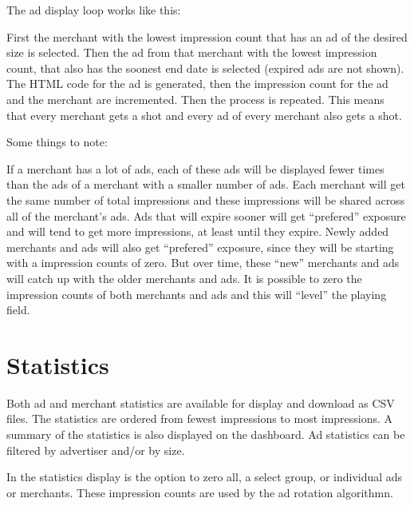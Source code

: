 \documentclass[letterpaper]{article}
\begin{document}
The ad display loop works like this:

First the merchant with the lowest impression count that has an ad of
the desired size is selected.  Then the ad from that merchant with the
lowest impression count, that also has the soonest end date is selected
(expired ads are not shown).  The HTML code for the ad is generated,
then the impression count for the ad and the merchant are incremented.
Then the process is repeated.  This means that every merchant gets a
shot and every ad of every merchant also gets a shot.

Some things to note:

If a merchant has a lot of ads, each of these ads will be displayed
fewer times than the ads of a merchant with a smaller number of ads. 
Each merchant will get the same number of total impressions and these
impressions will be shared across all of the merchant's ads.  Ads that
will expire sooner will get ``prefered'' exposure and will tend to get
more impressions, at least until they expire.  Newly added merchants and
ads will also get ``prefered'' exposure, since they will be starting
with a impression counts of zero.  But over time, these ``new''
merchants and ads will catch up with the older merchants and ads.  It is
possible to zero the impression counts of both merchants and ads and
this will ``level'' the playing field.

\section{Statistics}

Both ad and merchant statistics are available for display and download
as CSV files.  The statistics are ordered from fewest impressions to
most impressions. A summary of the statistics is also displayed on the
dashboard.  Ad statistics can be filtered by advertiser and/or by size.

In the statistics display is the option to zero all, a select group, or
individual ads or merchants. These impression counts are used by the ad
rotation algorithmn.
\end{document}
